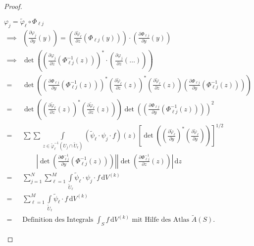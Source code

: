\begin{theorem}[Satz]
\begin{proof}
    \begin{notice*}[Nebenrechnung:] $\varphi_j = \widetilde{\varphi}_\ell \circ \Phi_{\ell j}$
      \begin{align*}
        \implies& \left( \frac{\partial \varphi_j}{\partial y}(y) \right) = \left( \frac{\partial \widetilde{\varphi}_\ell}{\partial z} (\Phi_{\ell j}(y)) \right) \cdot \left( \frac{\partial \Phi_{\ell j}}{\partial y}(y) \right) \\
        \implies& \det \left( \left( \frac{\partial \varphi_j}{\partial z} (\Phi_{\ell j}^{-1}(z)) \right)^* \cdot \left( \frac{\partial \varphi_j}{\partial z} (\ldots) \right) \right) \\
        =& \det \left(
          \left( \frac{\partial \Phi_{\ell j}}{\partial y}(\Phi_{\ell j}^{-1}(z)) \right)^*
          \left( \frac{\partial \widetilde{\varphi}_\ell}{\partial z} (z) \right)^*
          \left( \frac{\partial \widetilde{\varphi}_\ell}{\partial z} (z) \right)
          \left( \frac{\partial \Phi_{\ell j}}{\partial y}(\Phi_{\ell j}^{-1}(z)) \right)
        \right) \\
        =& \det \left(
          \left( \frac{\partial \widetilde{\varphi}_\ell}{\partial z} (z) \right)^*
          \left( \frac{\partial \widetilde{\varphi}_\ell}{\partial z} (z) \right)
        \right)
        \det \left(
          \left( \frac{\partial \Phi_{\ell j}}{\partial y}(\Phi_{\ell j}^{-1}(z)) \right)
        \right)^2 \\
        =& \sum \sum \int\limits_{z \in \widetilde{\varphi}_\ell^{-1}(U_j \cap \widetilde{U}_\ell)}
        \left(\widetilde{\psi}_\ell \cdot \psi_j \cdot f\right)(z)
        \left[ \det \left( \left( \frac{\partial \widetilde{\varphi}_\ell}{\partial y} \right)^* \left( \frac{\partial \widetilde{\varphi}_\ell}{\partial y} \right) \right) \right]^{1/2} \\
        &\qquad
        \left| \det\left( \frac{\partial \Phi_{\ell j}^{-1}}{\partial y} (\Phi_{\ell j}^{-1}(z)) \right) \right|
        \left| \det\left( \frac{\partial \Phi_{\ell j}^{-1}}{\partial z} (z) \right) \right|
        \, \mathrm{d}z \\
        =& \sum\limits_{j=1}^{N} \sum\limits_{\ell = 1}^{M} \int\limits_{\widetilde{U}_\ell} \widetilde{\psi}_\ell \cdot \psi_j \cdot f \, \mathrm{d}V^{(k)} \\
        =& \sum\limits_{\ell = 1}^{M} \int\limits_{\widetilde{U}_\ell} \widetilde{\psi}_\ell \cdot f \, \mathrm{d}V^{(k)} \\
        =& \text{Definition des Integrals $\int_S f \, \mathrm{d}V^{(k)}$ mit Hilfe des Atlas $\widetilde{A}(S)$.}
      \end{align*}
    \end{notice*}
  \end{proof}
\end{theorem}

